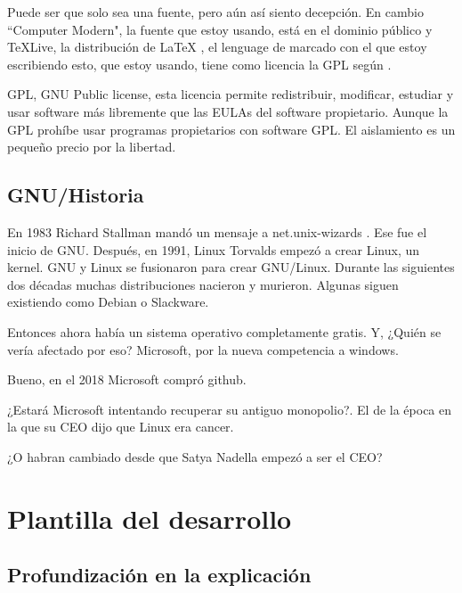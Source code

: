 \documentclass[12pt, twoside]{article}
\begin{document}
Puede ser que solo sea una fuente, pero aún así siento decepción.
En cambio ``Computer Modern", la fuente que estoy usando, está en el dominio público y \TeX Live, la distribución de \LaTeX
, el lenguage de marcado con el que estoy escribiendo esto, que estoy usando, tiene como licencia la GPL según \citet{TEXLIVE}.

GPL, GNU Public license, esta licencia permite redistribuir, modificar, estudiar y usar software más libremente que las EULAs del software propietario.
Aunque la GPL prohíbe usar programas propietarios con software GPL.
El aislamiento es un pequeño precio por la libertad.

%
\subsection{GNU/Historia}%
\label{sub:GNU}

En 1983 Richard Stallman mandó un mensaje a net.unix-wizards \citet[89]{faif}.
Ese fue el inicio de GNU.
Después, en 1991, Linux Torvalds empezó a crear Linux, un kernel.
GNU y Linux se fusionaron para crear GNU/Linux.
Durante las siguientes dos décadas muchas distribuciones nacieron y murieron.
Algunas siguen existiendo como Debian o Slackware. \citet{DISTROS}

Entonces ahora había un sistema operativo completamente gratis.
Y, ¿Quién se vería afectado por eso?
Microsoft, por la nueva competencia a windows. \citet{HALLO1}

Bueno, en el 2018 Microsoft compró github. \citet{GITHUB}

¿Estará Microsoft intentando recuperar su antiguo monopolio?.
El de la época en la que su CEO dijo que Linux era cancer. \citet{CANCER}

¿O habran cambiado desde que Satya Nadella empezó a ser el CEO?
\iffalse
\section{Plantilla del desarrollo}%

\subsection{Profundización en la explicación}%
\end{document}
